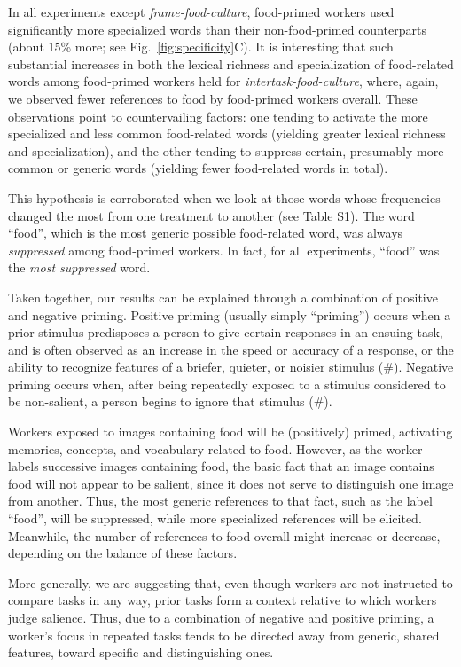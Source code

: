 \documentclass[12pt]{article}
\begin{document}
In all experiments except \textit{frame-food-culture}, food-primed workers 
used significantly more specialized words than their non-food-primed 
counterparts (about 15\% more; see Fig.~\ref{fig:specificity}C).
It is interesting that such substantial increases in both the lexical 
richness and specialization of food-related words among food-primed workers
held for \textit{intertask-food-culture}, where, again, we observed fewer 
references to food by food-primed workers overall. These observations point 
to countervailing factors: one tending to activate the more specialized and 
less common food-related words (yielding greater lexical richness and 
specialization), and the other tending to suppress certain, presumably more 
common or generic words (yielding fewer food-related words in total).

This hypothesis is corroborated when we look at those words whose 
frequencies changed the most from one treatment to another (see Table S1).  
The word ``food'', which is the most generic possible food-related word, was 
always \textit{suppressed} among food-primed workers.  In fact, 
for all experiments, ``food'' was the \textit{most suppressed} word.

Taken together, our results can be 
explained through a combination of positive and negative priming.
Positive priming (usually simply ``priming'') occurs when a prior stimulus 
predisposes a person to give certain responses in an ensuing task, and
is often observed as an increase in the speed or accuracy of a response, or
the ability to recognize features of a briefer, quieter, or noisier stimulus 
(\#).
Negative priming occurs when, after being repeatedly exposed to a stimulus 
considered to be non-salient, a person begins to ignore that 
stimulus (\#).  

Workers exposed to images containing food will be (positively) primed, 
activating memories, concepts, and vocabulary related to food.  
However, as the worker labels successive images containing food, the basic 
fact that an image contains food will not appear to be salient, since it 
does not serve to distinguish one image from another.  Thus, the most 
generic references to that fact, such as the label ``food'', 
will be suppressed, while more specialized references will be elicited.  
Meanwhile, the number of references to food overall might increase or 
decrease, depending on the balance of these factors.  

More generally, we are suggesting that, even though workers are not 
instructed to compare tasks in any way, prior tasks form a 
context relative to which workers judge salience.  Thus, due to a combination 
of negative and positive priming, a worker's focus 
in repeated tasks tends to be directed away from generic, shared features, 
toward specific and distinguishing ones.
\end{document}
